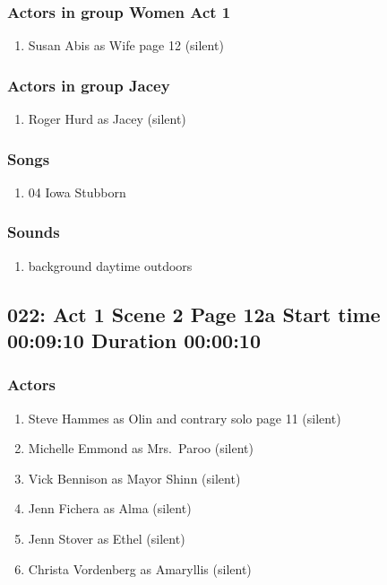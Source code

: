 \subsubsection{Actors in group Women Act 1}
\begin{enumerate}
\item Susan Abis as Wife page 12 (silent)
\end{enumerate}
\subsubsection{Actors in group Jacey}
\begin{enumerate}
\item Roger Hurd as Jacey (silent)
\end{enumerate}

\subsubsection{Songs}
\begin{enumerate}
\item 04 Iowa Stubborn
\end{enumerate}\subsubsection{Sounds}
\begin{enumerate}
\item background daytime outdoors
\end{enumerate}
\subsection{022: Act 1 Scene 2 Page 12a Start time 00:09:10 Duration 00:00:10}

\subsubsection{Actors}
\begin{enumerate}
\item Steve Hammes as Olin and contrary solo page 11 (silent)
\item Michelle Emmond as Mrs.~Paroo (silent)
\item Vick Bennison as Mayor Shinn (silent)
\item Jenn Fichera as Alma (silent)
\item Jenn Stover as Ethel (silent)
\item Christa Vordenberg as Amaryllis (silent)
\end{enumerate}
